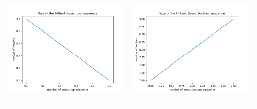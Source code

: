 \documentclass[10pt]{article}
\begin{document}
\begin{tabular}{c|c}
\begin{minipage}{.4\textwidth}
\includegraphics[width=\textwidth]{"DATA/5d/6 generators 1 bound A/top_sequence SIZE"}
\end{minipage} &
\begin{minipage}{.4\textwidth}
\includegraphics[width=\textwidth]{"DATA/5d/6 generators 1 bound A bottomup/bottom_sequence SIZE"}
\end{minipage} \\ \\
\hline \\\begin{minipage}{.4\textwidth}

\end{minipage}
\end{tabular}
\end{document}
